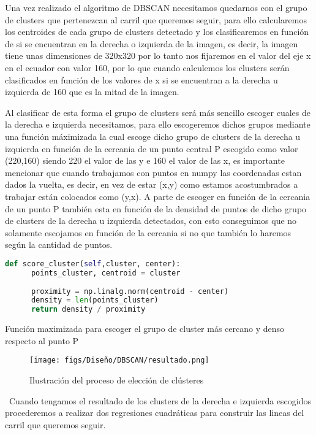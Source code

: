 Una vez realizado el algoritmo de DBSCAN necesitamos quedarnos con el grupo de clusters que pertenezcan al carril que queremos seguir, para ello calcularemos los centroides de cada
grupo de clusters detectado y los clasificaremos en función de si se encuentran en la derecha o izquierda de la imagen, es decir, la imagen tiene unas dimensiones de 320x320 por lo tanto 
nos fijaremos en el valor del eje x en el ecuador con valor 160, por lo que cuando calculemos los clusters serán clasificados en función de los valores de x si se encuentran a la derecha u izquierda de 160 
que es la mitad de la imagen. 

Al clasificar de esta forma el grupo de clusters será más sencillo escoger cuales de la derecha e izquierda necesitamos, para ello escogeremos dichos grupos mediante una función máximizada
la cual escoge dicho grupo de clusters de la derecha u izquierda en función de la cercania de un punto central P escogido como valor (220,160) siendo 220 el valor de las y e 160 el valor de las x, 
es importante mencionar que cuando trabajamos con puntos en numpy las coordenadas estan dados la vuelta, es decir, en vez de estar (x,y) como estamos acostumbrados a trabajar están colocados
como (y,x). A parte de escoger en función de la cercania de un punto P también esta en función de la densidad de puntos de dicho grupo de clusters de la derecha u izquierda detectados, con
esto conseguimos que no solamente escojamos en función de la cercania si no que también lo haremos según la cantidad de puntos. \newline

\begin{code}[h]
  \begin{lstlisting}[language=Python]
    def score_cluster(self,cluster, center):
      points_cluster, centroid = cluster
    
      proximity = np.linalg.norm(centroid - center)
      density = len(points_cluster)
      return density / proximity

  \end{lstlisting}
  \caption[Función maximizada para escoger el grupo de cluster más cercano y denso respecto al punto P]{Función maximizada para escoger el grupo de cluster más cercano y denso respecto al punto P}
  \label{cod:codejemplo}
  \end{code}  

\begin{figure} [H]
  \begin{center}
    \texttt{[image: figs/Diseño/DBSCAN/resultado.png]}
  \end{center}
  \caption{Ilustración del proceso de elección de clústeres }
  \label{fig:DBSCAN_imagen}
\end{figure}\
Cuando tengamos el resultado de los clusters de la derecha e izquierda escogidos procederemos a realizar dos regresiones cuadráticas para construir las lineas del carril que queremos seguir.
